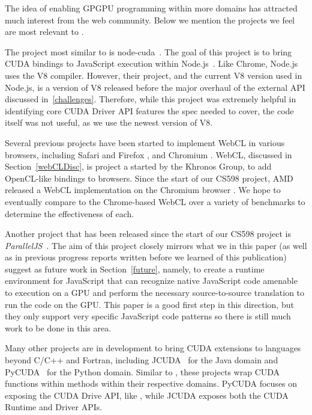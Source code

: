 
The idea of enabling GPGPU programming within more domains has attracted much
interest from the web community. Below we mention the projects we feel are most relevant
to \namens.

The project most similar to \name is node-cuda~\cite{nodeCuda}. The goal of
this project is to bring CUDA bindings to JavaScript execution within
Node.js~\cite{nodeJS}. Like Chrome, Node.js uses the V8 compiler. However,
their project, and the current V8 version used in Node.js, is a version of V8
released before the major overhaul of the external API discussed in~\ref{challenges}.
Therefore, while this project was extremely helpful in identifying core CUDA
Driver API features the \name spec needed to cover, the code itself was not
useful, as we use the newest version of V8.

Several previous projects have been started to implement WebCL \cite{webCL} in
various browsers, including Safari \cite{safariCL} and Firefox \cite{nokiaCL},
and Chromium \cite{chromeCL}.  WebCL, discussed in Section~\ref{webCLDisc}, is
project a started by the Khronos Group, to add OpenCL-like bindings to browsers.
Since the start of our CS598 project, AMD released a WebCL implementation on
the Chromium browser \cite{chromeCL}. We hope to eventually compare \name to
the Chrome-based WebCL over a variety of benchmarks to determine the
effectiveness of each.

Another project that has been released since the start of our CS598 project is
\textit{ParallelJS}~\cite{parallelJS}. The aim of this project closely mirrors
what we in this paper (as well as in previous progress reports written before we
learned of this publication) suggest as future work in Section~\ref{future}, namely, to create a
runtime environment for JavaScript that can recognize native JavaScript code amenable to
execution on a GPU and perform the necessary source-to-source translation to run
the code on the GPU. This paper is a good first step in this direction, but
they only support very specific JavaScript code patterns so there is still much
work to be done in this area.

Many other projects are in development to bring CUDA extensions to languages
beyond C/C++ and Fortran, including JCUDA~\cite{jcuda} for the Java domain and
PyCUDA~\cite{pycuda} for the Python domain.  Similar to \namens, these projects
wrap CUDA functions within methods within their respective domains. PyCUDA
focuses on exposing the CUDA Drive API, like \namens, while JCUDA exposes both
the CUDA Runtime and Driver APIs.


